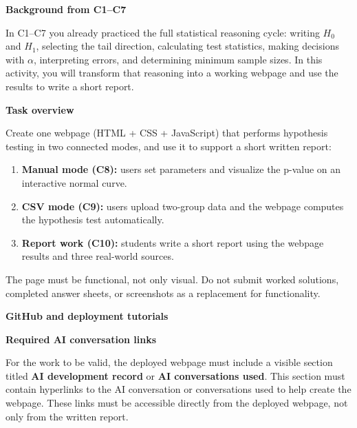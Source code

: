 \documentclass[12pt]{article}
\newcommand{\SubsectionBox}[1]{%
	\noindent\colorbox{gray!30}{%
		\parbox{\linewidth}{\textbf{#1}}%
	}\par\vspace{0.35cm}%
}
\begin{document}
	\vspace{0.25cm}
	
	\SubsectionBox{Background from C1--C7}
	In C1--C7 you already practiced the full statistical reasoning cycle: writing \(H_0\) and \(H_1\), selecting the tail direction, calculating test statistics, making decisions with \(\alpha\), interpreting errors, and determining minimum sample sizes. In this activity, you will transform that reasoning into a working webpage and use the results to write a short report.
	
	\SubsectionBox{Task overview}
	Create one webpage (HTML + CSS + JavaScript) that performs hypothesis testing in two connected modes, and use it to support a short written report:
	\begin{enumerate}
		\item \textbf{Manual mode (C8):} users set parameters and visualize the p-value on an interactive normal curve.
		\item \textbf{CSV mode (C9):} users upload two-group data and the webpage computes the hypothesis test automatically.
		\item \textbf{Report work (C10):} students write a short report using the webpage results and three real-world sources.
	\end{enumerate}
	The page must be functional, not only visual. Do not submit worked solutions, completed answer sheets, or screenshots as a replacement for functionality.
	
	\SubsectionBox{GitHub and deployment tutorials}
	\noindent{}
	
	\vspace{0.35cm}
	
	\SubsectionBox{Required AI conversation links}
	For the work to be valid, the deployed webpage must include a visible section titled \textbf{AI development record} or \textbf{AI conversations used}. This section must contain hyperlinks to the AI conversation or conversations used to help create the webpage. These links must be accessible directly from the deployed webpage, not only from the written report.
	
\end{document}
